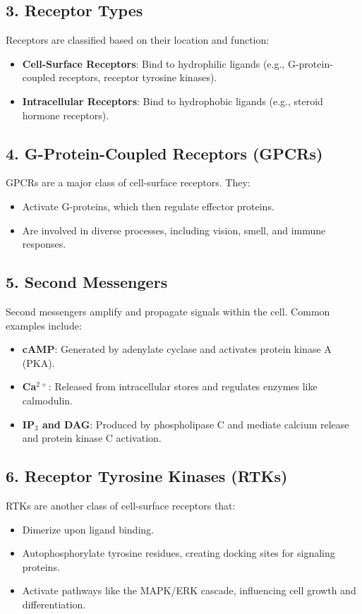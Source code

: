 \documentclass[12pt]{article}
\begin{document}
\subsection*{3. Receptor Types}
Receptors are classified based on their location and function:
\begin{itemize}
    \item \textbf{Cell-Surface Receptors}: Bind to hydrophilic ligands (e.g., G-protein-coupled receptors, receptor tyrosine kinases).
    \item \textbf{Intracellular Receptors}: Bind to hydrophobic ligands (e.g., steroid hormone receptors).
\end{itemize}

\subsection*{4. G-Protein-Coupled Receptors (GPCRs)}
GPCRs are a major class of cell-surface receptors. They:
\begin{itemize}
    \item Activate G-proteins, which then regulate effector proteins.
    \item Are involved in diverse processes, including vision, smell, and immune responses.
\end{itemize}

\subsection*{5. Second Messengers}
Second messengers amplify and propagate signals within the cell. Common examples include:
\begin{itemize}
    \item \textbf{cAMP}: Generated by adenylate cyclase and activates protein kinase A (PKA).
    \item \textbf{Ca$^{2+}$}: Released from intracellular stores and regulates enzymes like calmodulin.
    \item \textbf{IP$_3$ and DAG}: Produced by phospholipase C and mediate calcium release and protein kinase C activation.
\end{itemize}

\subsection*{6. Receptor Tyrosine Kinases (RTKs)}
RTKs are another class of cell-surface receptors that:
\begin{itemize}
    \item Dimerize upon ligand binding.
    \item Autophosphorylate tyrosine residues, creating docking sites for signaling proteins.
    \item Activate pathways like the MAPK/ERK cascade, influencing cell growth and differentiation.
\end{itemize}
\end{document}
